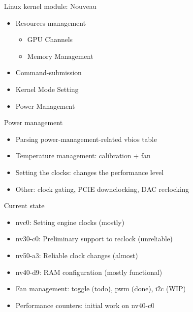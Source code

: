 \documentclass[11pt,english,compress]{beamer}
\begin{document}
		\begin{frame}
			\begin{block}{Linux kernel module: Nouveau}
				\begin{itemize}
					\item Resources management
						\begin{itemize}
							\item GPU Channels
							\item Memory Management
						\end{itemize}
					\item Command-submission
					\item Kernel Mode Setting
					\item Power Management
				\end{itemize}
			\end{block}
		\end{frame}

		\begin{frame}
			\begin{block}{Power management}
 				\begin{itemize}
					\item Parsing power-management-related vbios table
					\item Temperature management: calibration + fan
					\item Setting the clocks: changes the performance level
					\item Other: clock gating, PCIE downclocking, DAC reclocking
				\end{itemize}
			\end{block}

			\begin{block}{Current state}
				\begin{itemize}
					\item nvc0: Setting engine clocks (mostly)
					\item nv30-c0: Preliminary support to reclock (unreliable)
					\item nv50-a3: Reliable clock changes (almost)
					\item nv40-d9: RAM configuration (mostly functional)
					\item Fan management: toggle (todo), pwm (done), i2c (WIP)
					\item Performance counters: initial work on nv40-c0
				\end{itemize}
			\end{block}
		\end{frame}
\end{document}
